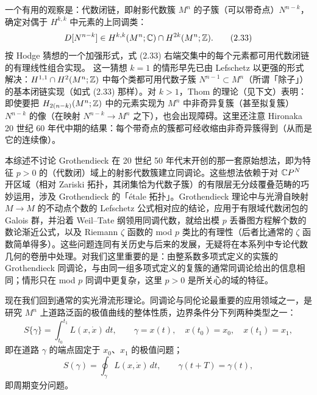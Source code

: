 一个有用的观察是：代数闭链，即射影代数簇 $M^n$ 的子簇（可以带奇点）$N^{n-k}$，确定对偶于 $H^{k,k}$ 中元素的上同调类：
\begin{equation}
  D[N^{n-k}]\in H^{k,k}(M^n;\mathbb{C})\cap H^{2k}(M^n;\mathbb{Z}). \tag{2.33}
\end{equation}
按 Hodge 猜想的一个加强形式，式 (2.33) 右端交集中的每个元素都可用代数闭链的有理线性组合实现。
这一猜想 $k=1$ 的情形早先已由 Lefschetz 以更强的形式解决：$H^{1,1}\cap H^2(M^n;\mathbb{Z})$ 中每个类都可用代数子簇 $N^{n-1}\subset M^n$（所谓「除子」）的基本闭链实现（如式 (2.33) 那样）。对 $k>1$，Thom 的理论（见下文）表明：即使要把 $H_{2(n-k)}(M^n;\mathbb{Z})$ 中的元素实现为 $M^n$ 中非奇异复簇（甚至拟复簇）$N^{n-k}$ 的像（在映射 $N^{n-k}\to M^n$ 之下），也会出现障碍。这里还注意 Hironaka 20 世纪 60 年代中期的结果：每个带奇点的簇都可经收缩由非奇异簇得到（从而是它的连续像）。

本综述不讨论 Grothendieck 在 20 世纪 50 年代末开创的那一套原始想法，即为特征 $p>0$ 的（代数闭）域上的射影代数簇建立同调论。这些想法依赖于对 $\mathbb{C}P^N$ 开区域（相对 Zariski 拓扑，其闭集恰为代数子簇）的有限层无分歧覆叠范畴的巧妙运用，涉及 Grothendieck 的「étale 拓扑」。Grothendieck 理论中与光滑自映射 $M\to M$ 的不动点个数的 Lefschetz 公式相对应的结论，应用于有限域代数闭包的 Galois 群，并沿着 Weil--Tate 纲领用同调代数，就给出模 $p$ 丢番图方程解个数的数论渐近公式，以及 Riemann $\zeta$ 函数的 mod $p$ 类比的有理性（后者比通常的 $\zeta$ 函数简单得多）。这些问题连同有关历史与后来的发展，无疑将在本系列中专论代数几何的卷册中处理。对我们这里重要的是：由整系数多项式定义的实簇的 Grothendieck 同调论，与由同一组多项式定义的复簇的通常同调论给出的信息相同；情形只在 mod $p$ 同调中更复杂，这里 $p>0$ 是所关心的域的特征。

现在我们回到通常的实光滑流形理论。同调论与同伦论最重要的应用领域之一，是研究 $M^n$ 上道路泛函的极值曲线的整体性质，边界条件分下列两种类型之一：
\begin{equation}
  S\{\gamma\}=\int_{t_0}^{t_1}L(x,\dot x)\,dt,\qquad
  \gamma=x(t),\quad x(t_0)=x_0,\quad x(t_1)=x_1, \tag{2.34}
\end{equation}
即在道路 $\gamma$ 的端点固定于 $x_0$、$x_1$ 的极值问题；
\begin{equation}
  S(\gamma)=\oint_\gamma L(x,\dot x)\,dt,\qquad \gamma(t+T)=\gamma(t), \tag{2.35}
\end{equation}
即周期变分问题。


